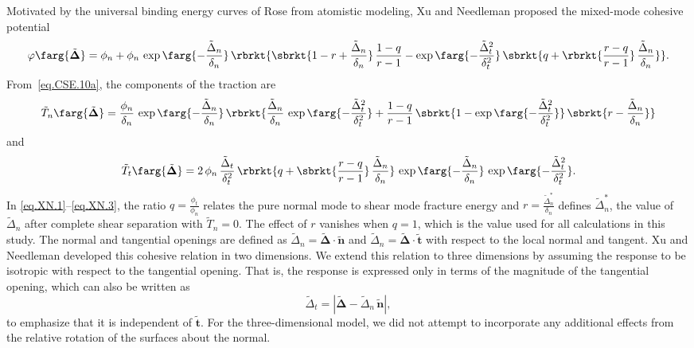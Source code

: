 Motivated by the universal binding energy 
curves of Rose \etal\cite{Rose1981} from atomistic modeling,
Xu and Needleman\cite{Needleman1994} proposed the mixed-mode cohesive potential
\begin{equation}
\label{eq.XN.1}    
\varphi\farg{\tilde{\boldsymbol{\Delta}}}=
    \phi_{n} +
    \phi_{n}\,\exp\farg{-\frac{\tilde{\Delta}_{n}}{\delta_{n}}}\,
    \rbrkt{
        \sbrkt{1 - r + \frac{\tilde{\Delta}_{n}}{\delta_{n}}}\,
        \frac{1 - q}{r - 1} -
	\exp\farg{-\frac{\tilde{\Delta}_{t}^{2}}{\delta_{t}^{2}}}\,
	\sbrkt{q + \rbrkt{\frac{r - q}{r - 1}}\,
	\frac{\tilde{\Delta}_{n}}{\delta_{n}}} 
    }.
\end{equation}
From~\eqref{eq.CSE.10a}, the components of the traction
are
\begin{equation}
\label{eq.XN.2}    
\tilde{T}_{n}\farg{\tilde{\boldsymbol{\Delta}}}=
    \frac{\phi_{n}}{\delta_{n}}\,
    \exp\farg{-\frac{\tilde{\Delta}_{n}}{\delta_{n}}}\,
    \rbrkt{
        \frac{\tilde{\Delta}_{n}}{\delta_{n}}\,
	\exp\farg{-\frac{\tilde{\Delta}_{t}^{2}}{\delta_{t}^{2}}}+
        \frac{1 - q}{r - 1}\,
	\sbrkt{
	    1 - \exp\farg{-\frac{\tilde{\Delta}_{t}^{2}}{\delta_{t}^{2}}}
	}\,
	\sbrkt{r - \frac{\tilde{\Delta}_{n}}{\delta_{n}}}
    }
\end{equation}
and
\begin{equation}
\label{eq.XN.3}    
\tilde{T}_{t}\farg{\tilde{\boldsymbol{\Delta}}}=
    2\,\phi_{n}\,\frac{\tilde{\Delta}_{t}}{\delta_{t}^{2}}\,
    \rbrkt{q + \sbrkt{\frac{r - q}{r - 1}}\,
    \frac{\tilde{\Delta}_{n}}{\delta_{n}}}\,
    \exp\farg{-\frac{\tilde{\Delta}_{n}}{\delta_{n}}}\,
    \exp\farg{-\frac{\tilde{\Delta}_{t}^{2}}{\delta_{t}^{2}}}.
\end{equation}
In \eqref{eq.XN.1}--\eqref{eq.XN.3},
the ratio $q=\frac{\phi_{t}}{\phi_{n}}$ relates the pure normal 
mode to shear mode fracture energy and 
$r=\frac{\tilde{\Delta}^{*}_{n}}{\delta_{n}}$ defines
$\tilde{\Delta}^{*}_{n}$, the value of $\tilde{\Delta}_{n}$ after 
complete shear separation with $\tilde{T}_{n} = 0$.
The effect of $r$ vanishes when $q=1$, which is the
value used for all calculations in this study.
The normal and tangential openings are defined as
$\tilde{\Delta}_{n}=\tilde{\boldsymbol{\Delta}}\cdot
\tilde{\mathbf{n}}$ and
$\tilde{\Delta}_{n}=\tilde{\boldsymbol{\Delta}}\cdot
\tilde{\mathbf{t}}$ with respect to the local normal and 
tangent. Xu and Needleman developed this cohesive relation
in two dimensions. We extend this relation to three dimensions by 
assuming the response to be isotropic with respect to the tangential
opening. That is, the response is expressed only in terms of the
magnitude of the tangential opening, which can also be written as
\begin{equation}
\tilde{\Delta}_{t}=\left|    
   \tilde{\boldsymbol{\Delta}}-
   \tilde{\Delta}_{n}\,\tilde{\mathbf{n}}
   \right|,
\end{equation}    
to emphasize that it is independent of $\tilde{\mathbf{t}}$.
For the three-dimensional model, we did not attempt to incorporate any 
additional effects from the relative rotation of the surfaces about
the normal.

